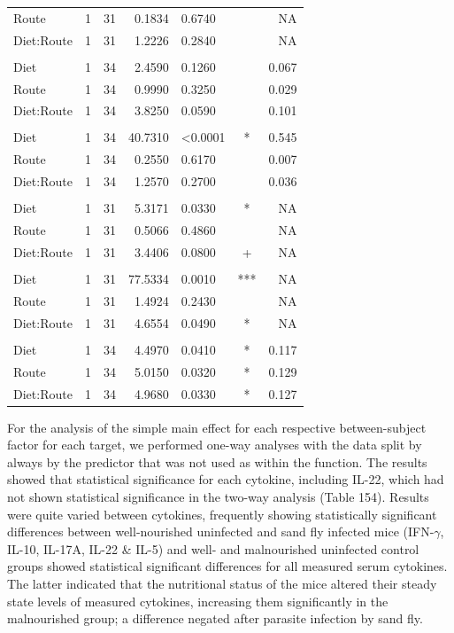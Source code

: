 \documentclass[
  12pt,
  letterpaper,
]{article}
\begin{document}
\begin{longtable}{lrrrlcr}
Route & 1 & 31 & 0.1834 & 0.6740 &   & NA \\ 
Diet:Route & 1 & 31 & 1.2226 & 0.2840 &   & NA \\ 
\midrule\addlinespace[2.5pt]
\multicolumn{7}{l}{IL-22} \\[2.5pt] 
\midrule\addlinespace[2.5pt]
Diet & 1 & 34 & 2.4590 & 0.1260 &  & 0.067 \\ 
Route & 1 & 34 & 0.9990 & 0.3250 &  & 0.029 \\ 
Diet:Route & 1 & 34 & 3.8250 & 0.0590 &  & 0.101 \\ 
\midrule\addlinespace[2.5pt]
\multicolumn{7}{l}{IL-4} \\[2.5pt] 
\midrule\addlinespace[2.5pt]
Diet & 1 & 34 & 40.7310 & <0.0001 & * & 0.545 \\ 
Route & 1 & 34 & 0.2550 & 0.6170 &  & 0.007 \\ 
Diet:Route & 1 & 34 & 1.2570 & 0.2700 &  & 0.036 \\ 
\midrule\addlinespace[2.5pt]
\multicolumn{7}{l}{IL-5} \\[2.5pt] 
\midrule\addlinespace[2.5pt]
Diet & 1 & 31 & 5.3171 & 0.0330 & * & NA \\ 
Route & 1 & 31 & 0.5066 & 0.4860 &   & NA \\ 
Diet:Route & 1 & 31 & 3.4406 & 0.0800 & + & NA \\ 
\midrule\addlinespace[2.5pt]
\multicolumn{7}{l}{IL-6} \\[2.5pt] 
\midrule\addlinespace[2.5pt]
Diet & 1 & 31 & 77.5334 & 0.0010 & *** & NA \\ 
Route & 1 & 31 & 1.4924 & 0.2430 &   & NA \\ 
Diet:Route & 1 & 31 & 4.6554 & 0.0490 & * & NA \\ 
\midrule\addlinespace[2.5pt]
\multicolumn{7}{l}{TNF-alpha} \\[2.5pt] 
\midrule\addlinespace[2.5pt]
Diet & 1 & 34 & 4.4970 & 0.0410 & * & 0.117 \\ 
Route & 1 & 34 & 5.0150 & 0.0320 & * & 0.129 \\ 
Diet:Route & 1 & 34 & 4.9680 & 0.0330 & * & 0.127 \\ 
\bottomrule
\end{longtable}
\endgroup

For the analysis of the simple main effect for each respective between-subject factor for each target, we performed one-way analyses with the data split by always by the predictor that was not used as within the function. The results showed that statistical significance for each cytokine, including IL-22, which had not shown statistical significance in the two-way analysis (Table 154). Results were quite varied between cytokines, frequently showing statistically significant differences between well-nourished uninfected and sand fly infected mice (IFN-\(\gamma\), IL-10, IL-17A, IL-22 \& IL-5) and well- and malnourished uninfected control groups showed statistical significant differences for all measured serum cytokines. The latter indicated that the nutritional status of the mice altered their steady state levels of measured cytokines, increasing them significantly in the malnourished group; a difference negated after parasite infection by sand fly.
\end{document}
